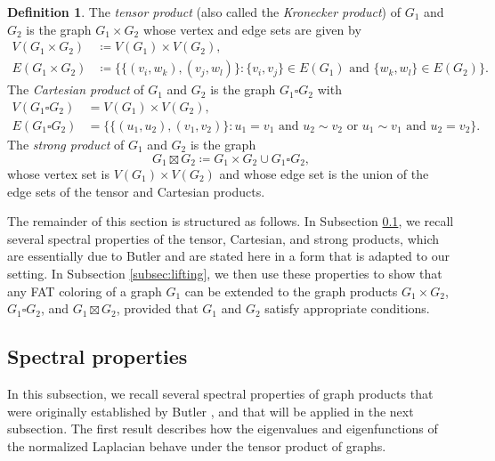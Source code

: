 \documentclass{article}
\theoremstyle{plain}
\theoremstyle{definition}
\newtheorem{definition}[theorem]{Definition}
\theoremstyle{remark}
\begin{document}
\begin{definition}
    The \emph{tensor product} (also called the \emph{Kronecker product}) of $G_1$ and $G_2$ is the graph $G_1\times G_2$ whose vertex and edge sets are given by
    \begin{align*}
        V(G_1\times G_2) &\coloneqq V(G_1) \times V(G_2),\\
        E(G_1\times G_2) &\coloneqq \biggl\{ \bigl\{(v_i,w_k),(v_j,w_l)\bigr\} \colon \{v_i,v_j\} \in E(G_1) \text{ and } \{w_k,w_l\} \in E(G_2)\biggr\}.
    \end{align*}
    The \emph{Cartesian product} of $G_1$ and $G_2$ is the graph $G_1\square G_2$ with
    \begin{align*}
        V(G_1 \square G_2) &= V(G_1) \times V(G_2),\\
        E(G_1 \square G_2) &= \bigl\{\{(u_1,u_2),(v_1,v_2)\} \colon u_1 = v_1 \text{ and } u_2\sim v_2 \text{ or } u_1 \sim v_1 \text{ and } u_2 = v_2\bigr\}.
    \end{align*}
    The \emph{strong product} of $G_1$ and $G_2$ is the graph $$G_1\boxtimes G_2 \coloneqq G_1\times G_2 \cup G_1\square G_2,$$ whose vertex set is $V(G_1)\times V(G_2)$ and whose edge set is the union of the edge sets of the tensor and Cartesian products.
\end{definition}


The remainder of this section is structured as follows. In Subsection \ref{subsec:spectralprop}, we recall several spectral properties of the tensor, Cartesian, and strong products, which are 
essentially due to Butler \cite{butler2016algebraic} and are stated here in a form that is adapted to our 
setting. In Subsection \ref{subsec:lifting}, we then use these properties to show that any FAT coloring of a graph $G_1$ can be extended to the graph products $G_1\times G_2$, $G_1\square G_2$, and $G_1\boxtimes G_2$, provided that $G_1$ and $G_2$ satisfy appropriate conditions.



\subsection{Spectral properties}\label{subsec:spectralprop}
In this subsection, we recall several spectral properties of graph products that were originally established by Butler \cite{butler2016algebraic}, and that will be applied in the next subsection. The first result describes how the eigenvalues and eigenfunctions of the normalized Laplacian behave under the tensor product of graphs.
\end{document}
